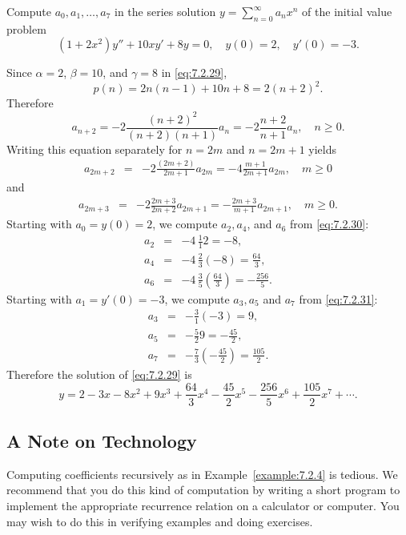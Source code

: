 \documentclass{ximera}
\begin{document}
\begin{example}\label{example:7.2.4}
Compute  $a_0, a_1, \dots, a_7$  in the series solution
$y=\sum_{n=0}^\infty a_nx^n$ of the initial value problem
\begin{equation}\label{eq:7.2.29}
(1+2x^2)y''+10xy'+8y=0,\quad y(0)=2,\quad y'(0)=-3.
\end{equation}
\begin{explanation}
Since $\alpha=2$, $\beta=10$, and $\gamma=8$ in \eqref{eq:7.2.29},
$$
p(n)=2n(n-1)+10n+8=2(n+2)^2.
$$
 Therefore
$$
a_{n+2}=-2\frac{(n+2)^2}{(n+2)(n+1)}a_n=-2\frac{n+2}{n+1}a_n,\quad n\geq0.
$$
Writing this equation separately for $n=2m$  and $n=2m+1$ yields
\begin{eqnarray}
a_{2m+2}&=&-2\frac{(2m+2)}{2m+1}a_{2m}=-4\frac{m+1}{2m+1}a_{2m},\quad m\geq
0\label{eq:7.2.30}
\end{eqnarray}
and
\begin{eqnarray}
a_{2m+3}&=&-2\frac{2m+3}{2m+2}a_{2m+1}=-\frac{2m+3}{m+1}a_{2m+1},\quad m\geq0.
\label{eq:7.2.31}
\end{eqnarray}
Starting with  $a_0=y(0)=2$, we compute $a_2, a_4$, and $a_6$ from
\eqref{eq:7.2.30}:
\begin{eqnarray*}
a_2&=&-4\,\frac{1}{1}2=-8,\\
a_4&=&-4\,\frac{2}{3}(-8)=\frac{64}{3},\\
a_6&=&-4\,\frac{3}{5}\left(\frac{64}{3}\right)=-\frac{256}{5}.
\end{eqnarray*}
Starting with $a_1=y'(0)=-3$, we compute $a_3,a_5$ and $a_7$ from
\eqref{eq:7.2.31}:
\begin{eqnarray*}
a_3&=&-\frac{3}{1}(-3)=9,\\
a_5&=&-\frac{5}{2}9=-\frac{45}{2},\\
a_7&=&-\frac{7}{3}\left(-\frac{45}{2}\right)=\frac{105}{2}.
\end{eqnarray*}
Therefore the solution of \eqref{eq:7.2.29} is
$$
y=2-3x-8x^2+9x^3+\frac{64}{3}x^4-\frac{45}{2}x^5-\frac{256}{5}
x^6+\frac{105}{2}x^7+\cdots .
$$
\end{explanation}
\end{example}


\subsection*{A Note on Technology}

Computing coefficients recursively as in Example~\ref{example:7.2.4} is
tedious. We recommend that you do this kind of computation by writing
a short program to implement the appropriate recurrence relation on a
calculator or computer. You may wish to do this in
verifying examples and doing exercises. %
\end{document}
